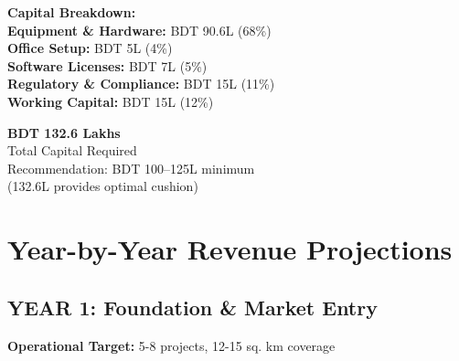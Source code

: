 \noindent
\begin{minipage}[t]{0.48\textwidth}
    \begin{tcolorbox}[colback=BoxBlue,colframe=SecondaryBlue,arc=4pt,boxrule=1pt,
        top=6pt,bottom=6pt,left=8pt,right=8pt]
        \small
        \textbf{\textcolor{PrimaryBlue}{Capital Breakdown:}}\\[4pt]
        \textbf{Equipment \& Hardware:} BDT 90.6L (68\%)\\
        \textbf{Office Setup:} BDT 5L (4\%)\\
        \textbf{Software Licenses:} BDT 7L (5\%)\\
        \textbf{Regulatory \& Compliance:} BDT 15L (11\%)\\
        \textbf{Working Capital:} BDT 15L (12\%)
    \end{tcolorbox}
\end{minipage}\hfill
\begin{minipage}[t]{0.48\textwidth}
    \begin{tcolorbox}[colback=BoxGreen,colframe=AccentGreen,arc=4pt,boxrule=1pt,
        top=6pt,bottom=6pt,left=8pt,right=8pt,halign=center]
        {\large\bfseries\color{AccentGreen}BDT 132.6 Lakhs}\\[4pt]
        {\small\color{DarkGrey}Total Capital Required}\\[2pt]
        {\small\color{DarkGrey}Recommendation: BDT 100--125L minimum\\
        (132.6L provides optimal cushion)}
    \end{tcolorbox}
\end{minipage}

\section{Year-by-Year Revenue Projections}

\subsection{YEAR 1: Foundation \& Market Entry}

\textbf{Operational Target:} 5-8 projects, 12-15 sq. km coverage

